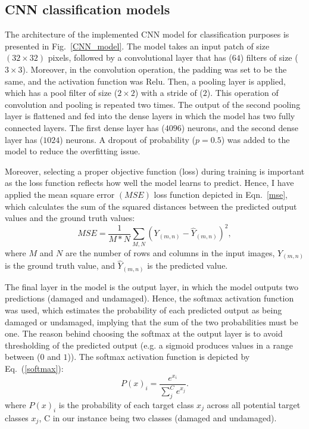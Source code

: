 \subsection{CNN classification models}
\label{sec422}
The architecture of the implemented CNN model for classification purposes is presented in Fig.~\ref{CNN_model}.
The model takes an input patch of size \((32\times 32)\) pixels, followed by a convolutional layer that has (\(64\)) filters of size (\(3\times 3\)).
Moreover, in the convolution operation, the padding was set to be the same,  and the activation function was Relu.
Then, a pooling layer is applied, which has a pool filter of size (\(2\times 2\)) with a stride of (\(2\)).
This operation of convolution and pooling is repeated two times.
The output of the second pooling layer is flattened and fed into the dense layers in which the model has two fully connected layers.
The first dense layer has (\(4096\)) neurons, and the second dense layer has (\(1024\)) neurons.
A dropout of probability (\(p = 0.5\)) was added to the model to reduce the overfitting issue.

Moreover, selecting a proper objective function (loss) during training is important as the loss function reflects how well the model learns to predict.
Hence, I have applied the mean square error \((MSE)\) loss function depicted in Eqn.~\ref{mse}, which calculates the sum of the squared distances between the predicted output values and the ground truth values:
\begin{equation}
	MSE=\frac{1}{M*N}\sum_{M,N}^{}(Y_{(m,n)}-\hat{Y}_{(m,n)})^2,
	\label{mse}
\end{equation}
where \(M\) and \(N\) are the number of rows and columns in the input images, \(Y_{(m,n)}\) is the ground truth value, and \(\hat{Y}_{(m,n)}\) is the predicted value.

The final layer in the model is the output layer, in which the model outputs two predictions (damaged and undamaged).
Hence, the softmax activation function was used, which estimates the probability of each predicted output as being damaged or undamaged, implying that the sum of the two probabilities must be one.
The reason behind choosing the softmax at the output layer is to avoid thresholding of the predicted output (e.g. a sigmoid produces values in a range between (\(0\) and \(1\))).
The softmax activation function is depicted by Eq.~(\ref{softmax}): 
\begin{equation}
	P(x)_{i} = \frac{e^{x_{i}}}{\sum_{j}^{C} e^{x_{j}}}.
	\label{softmax}
\end{equation} 
where \(P(x)_{i}\) is the probability of each target class \(x_{j}\) across all potential target classes \(x_{j}\), C in our instance being two classes (damaged and undamaged).

